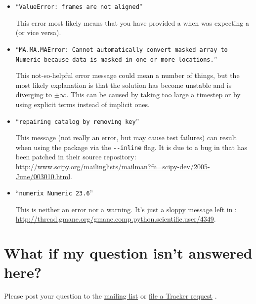        \begin{itemize}
            
            \item ``\texttt{ValueError: frames are not aligned}''
            
            This error most likely means that you have provided a
             when \FiPy{} was expecting a
             (or vice versa).

            \item ``\texttt{MA.MA.MAError: Cannot automatically
            convert masked array to Numeric because data is masked in one or
            more locations.}''
            
            This not-so-helpful error message could mean a number of things,
            but the most likely explanation is that the solution has become
            unstable and is diverging to $\pm\infty$.  This can be caused by
            taking too large a timestep or by using explicit terms instead of
            implicit ones.
            
            \item ``\texttt{repairing catalog by removing key}''
            
            This message (not really an error, but may cause test 
            failures) can result when using the \SciPy{} \weave{} 
            package via the \verb+--inline+ flag. It is due to a bug
            in \SciPy{} that has been patched in their source 
            repository: \url{http://www.scipy.org/mailinglists/mailman?fn=scipy-dev/2005-June/003010.html}.
            
            \item ``\texttt{numerix Numeric 23.6}''
            
            This is neither an error nor a warning. It's just a sloppy 
            message left in \SciPy{}:
            \url{http://thread.gmane.org/gmane.comp.python.scientific.user/4349}.
            
        \end{itemize}

    \section{What if my question isn't answered here?}  
        
        Please post your question to the
        \href{http://www.ctcms.nist.gov/fipy/mail.html}{mailing list}
        \cite{FiPyMailingList} or
        \href{http://sourceforge.net/tracker/?group_id=118428}{file a
        Tracker request} \cite{FiPyBugTracker}.
